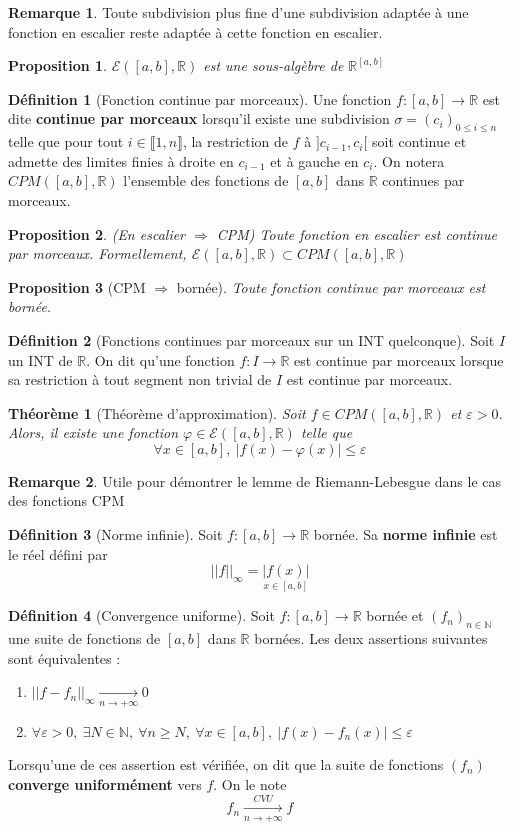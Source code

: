\documentclass[french]{book}
\newcommand{\N}{\mathbb{N}}
\newcommand{\R}{\mathbb{R}}
\theoremstyle{plain}
\newtheorem{thm}{Théorème}[chapter]
\newtheorem{prop}{Proposition}[chapter]
\theoremstyle{definition}
\newtheorem{dfn}{Définition}[chapter]
\newtheorem{rmq}{Remarque}[chapter]
\theoremstyle{remark}
\begin{document}
\begin{rmq} Toute subdivision plus fine d'une subdivision adaptée à une fonction en escalier reste adaptée à cette fonction en escalier. \end{rmq}
\begin{prop}
	$\mathcal{E}([a,b],\R)$ est une sous-algèbre de $\R^{[a,b]}$
\end{prop}
\begin{dfn}[Fonction continue par morceaux]
	Une fonction $f:[a,b]\rightarrow\R$ est dite \textbf{continue par morceaux} lorsqu'il existe une subdivision $\sigma=(c_i)_{0\leqslant i\leqslant n}$ telle que pour tout $i\in\llbracket1,n\rrbracket$, la restriction de $f$ à $]c_{i-1},c_i[$ soit continue et admette des limites finies à droite en $c_{i-1}$ et à gauche en $c_i$. On notera $CPM([a,b],\R)$ l'ensemble des fonctions de $[a,b]$ dans $\R$ continues par morceaux.
\end{dfn}
\begin{prop}(En escalier $\Rightarrow$ CPM)
	Toute fonction en escalier est continue par morceaux. Formellement, $\mathcal{E}([a,b],\R) \subset CPM([a,b],\R)$ 
\end{prop}
\begin{prop}[CPM $\Rightarrow$ bornée]
	Toute fonction continue par morceaux est bornée.
\end{prop}
\begin{dfn}[Fonctions continues par morceaux sur un INT quelconque]
	Soit $I$ un INT de $\R$. On dit qu'une fonction $f:I\rightarrow\R$ est continue par morceaux lorsque sa restriction à tout segment non trivial de $I$ est continue par morceaux.
\end{dfn}
\begin{thm}[Théorème d'approximation]
	Soit $f\in CPM([a,b],\R)$ et $\varepsilon>0$. Alors, il existe une fonction $\varphi\in\mathcal{E}([a,b],\R)$ telle que $$\forall x \in [a,b], \ |f(x)-\varphi(x)|\leqslant \varepsilon$$
\end{thm}
\begin{rmq} Utile pour démontrer le lemme de Riemann-Lebesgue dans le cas des fonctions CPM \end{rmq}
\begin{dfn}[Norme infinie]
	Soit $f:[a,b]\rightarrow\R$ bornée. Sa \textbf{norme infinie} est le réel défini par $$||f||_\infty= \underset{x\in[a,b]}{|f(x)|}$$
\end{dfn}
\begin{dfn}[Convergence uniforme]
	Soit $f:[a,b]\rightarrow\R$ bornée et $(f_n)_{n\in\N}$ une suite de fonctions de $[a,b]$ dans $\R$ bornées. Les deux assertions suivantes sont équivalentes :
	\begin{enumerate}
		\item $||f-f_n||_\infty \xrightarrow[n\to+\infty]{}0$
		\item $\forall \varepsilon>0, \ \exists N\in\N, \ \forall n\geqslant N, \ \forall x\in[a,b], \ |f(x)-f_n(x)|\leqslant \varepsilon$
	\end{enumerate}
	Lorsqu'une de ces assertion est vérifiée, on dit que la suite de fonctions $(f_n)$ \textbf{converge uniformément} vers $f$. On le note $$f_n \xrightarrow[n\to+\infty]{CVU} f$$
\end{dfn}
\end{document}
